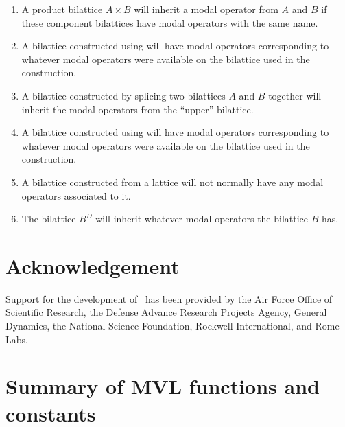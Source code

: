 \begin{enumerate}
 \item A product bilattice $A \times B$ will inherit a modal operator
from $A$ and $B$ if these component bilattices have modal operators
with the same name.
 \item A bilattice constructed using  will have
modal operators corresponding to whatever modal operators were available
on the bilattice used in the construction.
 \item A bilattice constructed by splicing two bilattices $A$ and $B$
together will inherit the modal operators from the ``upper'' bilattice.
 \item A bilattice constructed using  will
have modal operators corresponding to whatever modal operators were
available on the bilattice used in the construction.
 \item A bilattice constructed from a lattice will not normally have
any modal operators associated to it.
 \item The bilattice $B^D$ will inherit whatever modal operators the
bilattice $B$ has.
 \end{enumerate}

\section*{Acknowledgement}

Support for the development of \mvl\ has been provided by the Air
Force Office of Scientific Research, the Defense Advance Research
Projects Agency, General Dynamics, the National Science Foundation,
Rockwell International, and Rome Labs.

\clearpage

\appendix

\section{Summary of MVL functions and constants}


